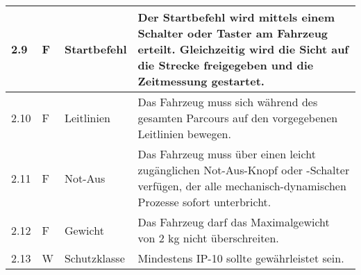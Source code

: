 \documentclass[main.tex]{subfiles} %
\begin{document}
\begin{tabular}{|l|p{0.5cm}|p{4cm}|p{10cm}|}
  \hline
  2.9          & F                     & Startbefehl                                                           & Der Startbefehl wird mittels einem Schalter oder Taster am Fahrzeug erteilt. Gleichzeitig wird die Sicht auf die Strecke freigegeben und die Zeitmessung gestartet.                                                                                                                                                                        \\
  \hline
  2.10         & F                     & Leitlinien                                                            & Das Fahrzeug muss sich während des gesamten Parcours auf den vorgegebenen Leitlinien bewegen.                                                                                                                                                                                                                                              \\
  \hline
  2.11         & F                     & Not-Aus                                                               & Das Fahrzeug muss über einen leicht zugänglichen Not-Aus-Knopf oder -Schalter verfügen, der alle mechanisch-dynamischen Prozesse sofort unterbricht.                                                                                                                                                                                       \\
  \hline
  2.12         & F                     & Gewicht                                                               & Das Fahrzeug darf das Maximalgewicht von 2 kg nicht überschreiten.                                                                                                                                                                                                                                                                         \\
  \hline
  2.13         & W                     & Schutzklasse                                                          & Mindestens IP-10 sollte gewährleistet sein.                                                                                                                                                                                                                                                                                                \\
  \hline
\end{tabular}
\end{document}
